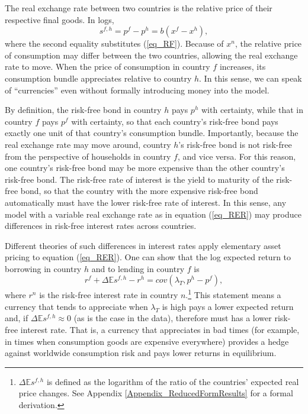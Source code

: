 \documentclass{ar-1col}
\begin{document}
The real exchange rate between two countries is the relative price of
their respective final goods. In logs,
\begin{equation}\label{eq_RER}
  s^{f,h}=p^{f}-p^{h}=b(x^{f}-x^{h}),
\end{equation}
where the second equality substitutes (\ref{eq_RF}). Because of
$x^{n}$, the relative price of consumption may differ between the two
countries, allowing the real exchange rate to move. When the price of
consumption in country $f$ increases, its consumption bundle
appreciates relative to country $h$. In this sense, we can speak of
``currencies'' even without formally introducing money into the model.

By definition, the risk-free bond in country $h$ pays $p^h$ with
certainty, while that in country $f$ pays $p^f$ with certainty, so
that each country's risk-free bond pays exactly one unit of that
country's consumption bundle. Importantly, because the real exchange
rate may move around, country $h$'s risk-free bond is not risk-free
from the perspective of households in country $f$, and vice versa. For
this reason, one country's risk-free bond may be more expensive than
the other country's risk-free bond. The risk-free rate of interest is
the yield to maturity of the risk-free bond, so that the country with
the more expensive risk-free bond automatically must have the lower
risk-free rate of interest. In this sense, any model with a variable
real exchange rate as in equation (\ref{eq_RER}) may produce
differences in risk-free interest rates across countries.

Different theories of such differences in interest rates apply
elementary asset pricing to equation (\ref{eq_RER}). One can show that
the log expected return to borrowing in country $h$ and to lending in
country $f$ is
\begin{equation}
  r^{f} + \Delta \mathbb{E} s^{f,h} - r^{h} =cov\left( \lambda _{T},p^{h}-p^{f}\right),
  \label{eq_UIP_RF}
\end{equation}%
where $r^{n}$ is the risk-free interest rate in country
$n$.\footnote{$\Delta\mathbb{E}s^{f,h}$ is defined as the logarithm of
  the ratio of the countries' expected real price changes. See
  Appendix \ref{Appendix_ReducedFormResults} for a formal derivation.}
This statement means a currency that tends to appreciate when
$\lambda_T$ is high pays a lower expected return and, if
$\Delta \mathbb{E} s^{f,h}\approx0$ (as is the case in the data),
therefore must has a lower risk-free interest rate. That is, a
currency that appreciates in bad times (for example, in times when
consumption goods are expensive everywhere) provides a hedge against
worldwide consumption risk and pays lower returns in equilibrium.
\end{document}
